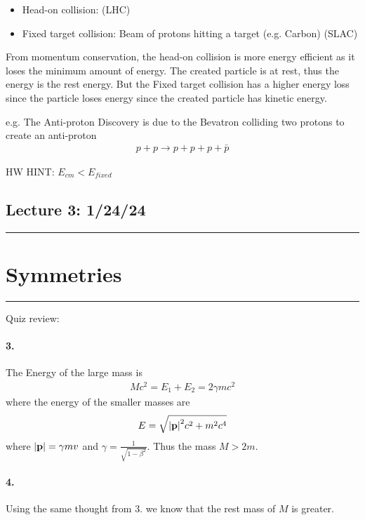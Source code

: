 \documentclass[../main.tex]{subfiles}
\begin{document}
\begin{itemize}
    \item Head-on collision: (LHC)
    \item Fixed target collision: Beam of protons hitting a target (e.g. Carbon) (SLAC)
\end{itemize}  
From momentum conservation, the head-on collision is more energy efficient as it loses the minimum
amount of energy. The created particle is at rest, thus the energy is the rest energy. But the Fixed
target collision has a higher energy loss since the particle loses energy since the created particle
has kinetic energy.

e.g. The Anti-proton Discovery is due to the Bevatron colliding two protons to create an anti-proton
\begin{align*}
    p + p \rightarrow p + p + p + \bar p
\end{align*}

HW HINT: $E_{cm} < E_{fixed}$

\newpage
\subsection*{Lecture 3: \hfill  1/24/24}
\hrule \vspace{10px}
\section{Symmetries}
\hrule \vspace{10px}

Quiz review:

\paragraph{3.} The Energy of the large mass is 
\begin{align*}
    Mc^2 = E_1 + E_2 = 2\gamma m c^2
\end{align*}
where the energy of the smaller masses are
\begin{align*}
    E = \sqrt{\abs{\vb{p}}^2 c^2 + m^2 c^4} 
\end{align*}
where $\abs{\vb{p}} = \gamma mv$ and $\gamma = \frac{1}{\sqrt{1 - \beta^2}}$. Thus the mass $M >2m$.

\paragraph{4.} Using the same thought from 3. we know that the rest mass of $M$ is greater.
\end{document}
